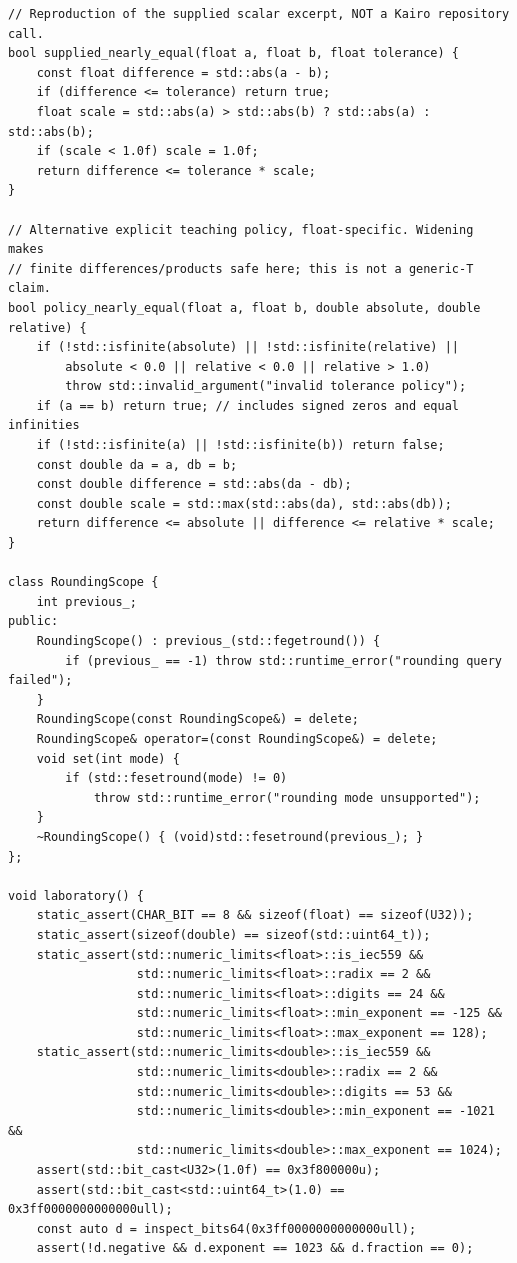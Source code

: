 \begin{verbatim}
// Reproduction of the supplied scalar excerpt, NOT a Kairo repository call.
bool supplied_nearly_equal(float a, float b, float tolerance) {
    const float difference = std::abs(a - b);
    if (difference <= tolerance) return true;
    float scale = std::abs(a) > std::abs(b) ? std::abs(a) : std::abs(b);
    if (scale < 1.0f) scale = 1.0f;
    return difference <= tolerance * scale;
}

// Alternative explicit teaching policy, float-specific. Widening makes
// finite differences/products safe here; this is not a generic-T claim.
bool policy_nearly_equal(float a, float b, double absolute, double relative) {
    if (!std::isfinite(absolute) || !std::isfinite(relative) ||
        absolute < 0.0 || relative < 0.0 || relative > 1.0)
        throw std::invalid_argument("invalid tolerance policy");
    if (a == b) return true; // includes signed zeros and equal infinities
    if (!std::isfinite(a) || !std::isfinite(b)) return false;
    const double da = a, db = b;
    const double difference = std::abs(da - db);
    const double scale = std::max(std::abs(da), std::abs(db));
    return difference <= absolute || difference <= relative * scale;
}

class RoundingScope {
    int previous_;
public:
    RoundingScope() : previous_(std::fegetround()) {
        if (previous_ == -1) throw std::runtime_error("rounding query failed");
    }
    RoundingScope(const RoundingScope&) = delete;
    RoundingScope& operator=(const RoundingScope&) = delete;
    void set(int mode) {
        if (std::fesetround(mode) != 0)
            throw std::runtime_error("rounding mode unsupported");
    }
    ~RoundingScope() { (void)std::fesetround(previous_); }
};

void laboratory() {
    static_assert(CHAR_BIT == 8 && sizeof(float) == sizeof(U32));
    static_assert(sizeof(double) == sizeof(std::uint64_t));
    static_assert(std::numeric_limits<float>::is_iec559 &&
                  std::numeric_limits<float>::radix == 2 &&
                  std::numeric_limits<float>::digits == 24 &&
                  std::numeric_limits<float>::min_exponent == -125 &&
                  std::numeric_limits<float>::max_exponent == 128);
    static_assert(std::numeric_limits<double>::is_iec559 &&
                  std::numeric_limits<double>::radix == 2 &&
                  std::numeric_limits<double>::digits == 53 &&
                  std::numeric_limits<double>::min_exponent == -1021 &&
                  std::numeric_limits<double>::max_exponent == 1024);
    assert(std::bit_cast<U32>(1.0f) == 0x3f800000u);
    assert(std::bit_cast<std::uint64_t>(1.0) == 0x3ff0000000000000ull);
    const auto d = inspect_bits64(0x3ff0000000000000ull);
    assert(!d.negative && d.exponent == 1023 && d.fraction == 0);


\end{verbatim}
